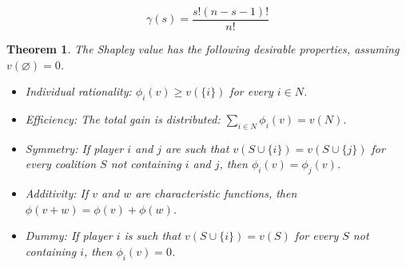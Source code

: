 \documentclass[12pt]{article}
\newtheorem{theorem}{Theorem}[section]
\theoremstyle{definition}
\begin{document}
\[
\gamma(s)=\frac{s!(n-s-1)!}{n!}
\]
\begin{theorem}\normalfont The Shapley value has the following desirable properties, assuming $v(\varnothing)=0$.
\begin{itemize}
  \item Individual rationality: $\phi_i(v)\geq v(\{i\})$ for every $i\in N$.
  \item Efficiency: The total gain is distributed: $\sum_{i\in N}\phi_i(v)=v(N)$.
  \item Symmetry: If player $i$ and $j$ are such that $v(S\cup\{i\})=v(S\cup\{j\})$ for every coalition $S$ not containing $i$ and $j$, then $\phi_i(v)=\phi_j(v)$.
  \item Additivity: If $v$ and $w$ are characteristic functions, then $\phi(v+w)=\phi(v)+\phi(w)$.
  \item Dummy: If player $i$ is such that $v(S\cup\{i\})=v(S)$ for every $S$ not containing $i$, then $\phi_i(v)=0$.
\end{itemize}
\end{theorem}
\end{document}

